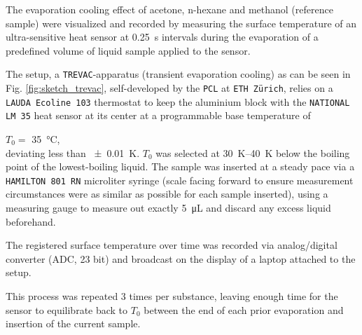 {The evaporation cooling effect of acetone, n-hexane and methanol (reference sample) were visualized and recorded by measuring the surface temperature of an ultra-sensitive heat sensor at \qty{0.25}{\second} intervals during the evaporation of a predefined volume of liquid sample applied to the sensor.

The setup, a \texttt{TREVAC}-apparatus (transient evaporation cooling) as can be seen in Fig. \ref{fig:sketch_trevac}, self-developed by the \texttt{PCL} at \texttt{ETH Zürich}, relies on a \texttt{LAUDA Ecoline 103} thermostat to keep the aluminium block with the \texttt{NATIONAL LM 35} heat sensor at its center at a programmable base temperature of 

$T_0=$ \qty{35}{\celsius}, 
\\deviating less than \qty{\pm 0.01}{\kelvin}. $T_0$ was selected at \qtyrange{30}{40}{\kelvin} below the boiling point of the lowest-boiling liquid. The sample was inserted at a steady pace via a \texttt{HAMILTON 801 RN} microliter syringe (scale facing forward to ensure measurement circumstances were as similar as possible for each sample inserted), using a measuring gauge to measure out exactly \qty{5}{\micro\liter} and discard any excess liquid beforehand. 

The registered surface temperature over time was recorded via analog/digital converter (ADC, 23 bit) and broadcast on the display of a laptop attached to the setup. 

This process was repeated 3 times per substance, leaving enough time for the sensor to equilibrate back to $T_0$ between the end of each prior evaporation and insertion of the current sample.




\subsection{}

}